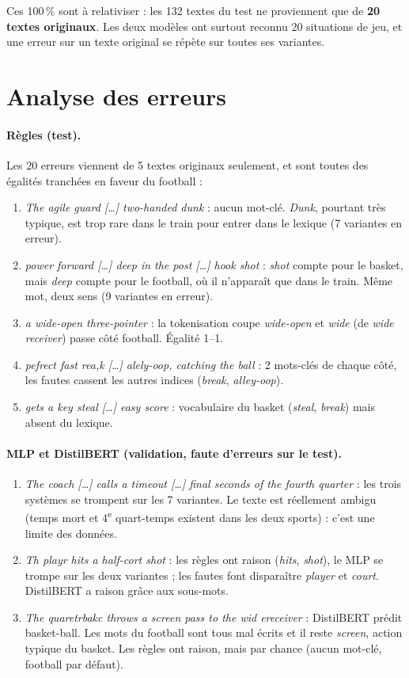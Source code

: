 \documentclass[11pt,a4paper]{article}
\begin{document}
Ces 100\,\% sont à relativiser : les 132 textes du test ne proviennent que de \textbf{20 textes originaux}. Les deux modèles ont surtout reconnu 20 situations de jeu, et une erreur sur un texte original se répète sur toutes ses variantes.

\section{Analyse des erreurs}

\paragraph{Règles (test).} Les 20 erreurs viennent de 5 textes originaux seulement, et sont toutes des égalités tranchées en faveur du football :
\begin{enumerate}
  \item \emph{The agile guard [\ldots] two-handed dunk} : aucun mot-clé. \emph{Dunk}, pourtant très typique, est trop rare dans le train pour entrer dans le lexique (7 variantes en erreur).
  \item \emph{power forward [\ldots] deep in the post [\ldots] hook shot} : \emph{shot} compte pour le basket, mais \emph{deep} compte pour le football, où il n'apparaît que dans le train. Même mot, deux sens (9 variantes en erreur).
  \item \emph{a wide-open three-pointer} : la tokenisation coupe \emph{wide-open} et \emph{wide} (de \emph{wide receiver}) passe côté football. Égalité 1--1.
  \item \emph{pefrect fast rea,k [\ldots] alely-oop, catching the ball} : 2 mots-clés de chaque côté, les fautes cassent les autres indices (\emph{break}, \emph{alley-oop}).
  \item \emph{gets a key steal [\ldots] easy score} : vocabulaire du basket (\emph{steal}, \emph{break}) mais absent du lexique.
\end{enumerate}

\paragraph{MLP et DistilBERT (validation, faute d'erreurs sur le test).}
\begin{enumerate}[resume]
  \item \emph{The coach [\ldots] calls a timeout [\ldots] final seconds of the fourth quarter} : les trois systèmes se trompent sur les 7 variantes. Le texte est réellement ambigu (temps mort et 4\textsuperscript{e} quart-temps existent dans les deux sports) : c'est une limite des données.
  \item \emph{Th playr hits a half-cort shot} : les règles ont raison (\emph{hits}, \emph{shot}), le MLP se trompe sur les deux variantes ; les fautes font disparaître \emph{player} et \emph{court}. DistilBERT a raison grâce aux sous-mots.
  \item \emph{The quaretrbakc throws a screen pass to the wid ereceiver} : DistilBERT prédit basket-ball. Les mots du football sont tous mal écrits et il reste \emph{screen}, action typique du basket. Les règles ont raison, mais par chance (aucun mot-clé, football par défaut).
\end{enumerate}
\end{document}
